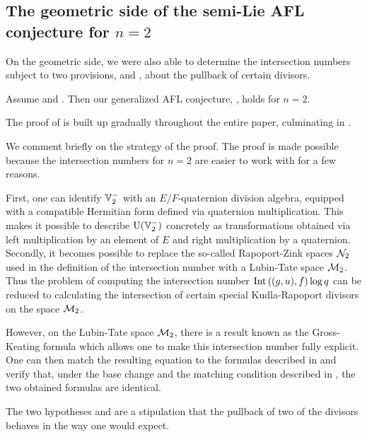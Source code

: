 \subsection{The geometric side of the semi-Lie AFL conjecture for $n=2$}
On the geometric side, we were also able to determine the intersection numbers
subject to two provisions,
 and ,
about the pullback of certain divisors.
\begin{theorem}
  [Semi-Lie AFL for $n=2$]
  \label{thm:semi_lie_n_equals_2}
  Assume  and .
  Then our generalized AFL conjecture, , holds for $n = 2$.
\end{theorem}
The proof of  is built up gradually
throughout the entire paper, culminating in .

We comment briefly on the strategy of the proof.
The proof is made possible because the intersection numbers for $n=2$
are easier to work with for a few reasons.
\begin{itemize}
\ii First, one can identify $\mathbb V_2^-$ with an $E/F$-quaternion division algebra,
equipped with a compatible Hermitian form defined via quaternion multiplication.
This makes it possible to describe $\operatorname{U}(\mathbb V_2^-)$ concretely as transformations obtained
via left multiplication by an element of $E$ and right multiplication by a quaternion.
\ii Secondly, it becomes possible to replace the so-called Rapoport-Zink spaces $\mathcal N_2$
used in the definition of the intersection number with a Lubin-Tate space $\mathcal M_2$.
Thus the problem of computing the intersection number
$\operatorname{Int}\left( (g,u), f \right) \log q$
can be reduced to calculating the intersection of certain special
Kudla-Rapoport divisors on the space $\mathcal M_2$.

However, on the Lubin-Tate space $\mathcal M_2$,
there is a result known as the Gross-Keating formula \cite{ref:GK}
which allows one to make this intersection number fully explicit.
One can then match the resulting equation to the formulas described in
and verify that, under the base change 
and the matching condition described in ,
the two obtained formulas are identical.
\end{itemize}
The two hypotheses  and 
are a stipulation that the pullback of two of the divisors
behaves in the way one would expect.

